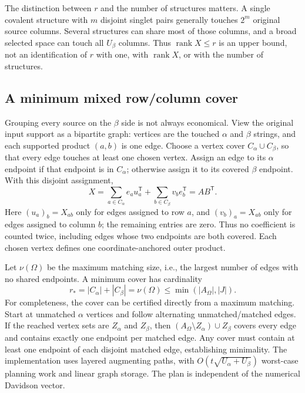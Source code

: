 \documentclass[11pt,a4paper]{article}
\DeclareMathOperator{\rank}{rank}
\newcommand{\Tr}{^{\mathsf T}}
\begin{document}
The distinction between $r$ and the number of structures matters. A single
covalent structure with $m$ disjoint singlet pairs generally touches
$2^m$ original source columns. Several structures can share most of those
columns, and a broad selected space can touch all $U_\beta$ columns.
Thus $\rank X\le r$ is an upper bound, not an identification of $r$ with
one, with $\rank X$, or with the number of structures.

\subsection{A minimum mixed row/column cover}\label{sec:cover}

Grouping every source on the $\beta$ side is not always economical. View
the original input support as a bipartite graph: vertices are the touched
$\alpha$ and $\beta$ strings, and each supported product $(a,b)$ is one
edge. Choose a vertex cover $C_\alpha\cup C_\beta$, so that every edge
touches at least one chosen vertex. Assign an edge to its $\alpha$ endpoint
if that endpoint is in $C_\alpha$; otherwise assign it to its covered
$\beta$ endpoint. With this disjoint assignment,
\begin{equation}\label{eq:cover}
 X=\sum_{a\in C_\alpha}e_a u_a\Tr
   +\sum_{b\in C_\beta}v_b e_b\Tr=AB\Tr.
\end{equation}
Here $(u_a)_b=X_{ab}$ only for edges assigned to row $a$, and
$(v_b)_a=X_{ab}$ only for edges assigned to column $b$; the remaining
entries are zero. Thus no coefficient is counted twice, including edges
whose two endpoints are both covered. Each chosen vertex defines one
coordinate-anchored outer product.

Let $\nu(\Omega)$ be the maximum matching size, i.e., the largest number
of edges with no shared endpoints. A minimum cover has cardinality
\begin{equation}
 r_* = |C_\alpha|+|C_\beta|=\nu(\Omega)
 \le\min(|A_\Omega|,|J|).
\end{equation}
For completeness, the cover can be certified directly from a maximum
matching. Start at unmatched $\alpha$ vertices and follow alternating
unmatched/matched edges. If the reached vertex sets are $Z_\alpha$ and
$Z_\beta$, then
$(A_\Omega\setminus Z_\alpha)\cup Z_\beta$ covers every edge and
contains exactly one endpoint per matched edge. Any cover must contain
at least one endpoint of each disjoint matched edge, establishing
minimality. The implementation uses layered augmenting paths, with
$O(t\sqrt{U_\alpha+U_\beta})$ worst-case planning work and linear graph
storage. The plan is independent of the numerical Davidson vector.
\end{document}
